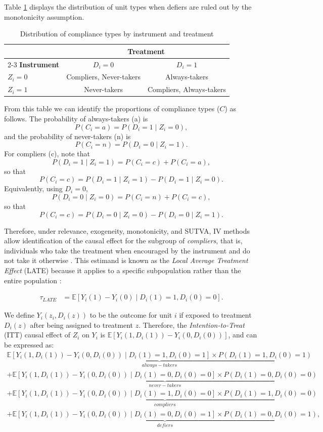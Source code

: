Table \ref{tab:2x2} displays the distribution of unit types when defiers are ruled out by the monotonicity assumption. 

\begin{table}[ht]
	\centering
	\caption{Distribution of compliance types by instrument and treatment}\label{tab:2x2}
	\begin{tabular}{lcc}
		\hline
		& \multicolumn{2}{c}{\textbf{Treatment}} \\ 
		\cline{2-3}
		\textbf{Instrument} & $D_i = 0$ & $D_i = 1$ \\ 
		\hline
		$Z_i=0$  & Compliers, Never-takers & Always-takers \\[0.25em]
		$Z_i=1$  & Never-takers & Compliers, Always-takers \\ 
		\hline
	\end{tabular}
\end{table}

From this table we can identify the proportions of compliance types ($C$) as follows. The probability of always-takers (a) is
\[
P(C_i = a) = P(D_i=1 \mid Z_i=0),
\]
and the probability of never-takers (n) is
\[
P(C_i = n) = P(D_i=0 \mid Z_i=1).
\]
For compliers (c), note that
\[
P(D_i=1 \mid Z_i=1) = P(C_i=c) + P(C_i=a),
\]
so that
\[
P(C_i = c) = P(D_i=1 \mid Z_i=1) - P(D_i=1 \mid Z_i=0).
\]
Equivalently, using $D_i=0$,
\[
P(D_i=0 \mid Z_i=0) = P(C_i=n) + P(C_i=c),
\]
so that
\[
P(C_i = c) = P(D_i=0 \mid Z_i=0) - P(D_i=0 \mid Z_i=1).
\]

Therefore, under relevance, exogeneity, monotonicity, and SUTVA, IV methods allow identification of the causal effect for the subgroup of \textit{compliers}, that is, individuals who take the treatment when encouraged by the instrument and do not take it otherwise \cite{imbens1994identification,angrist1996identification}. This estimand is known as the \textit{Local Average Treatment Effect} (LATE) because it applies to a specific subpopulation rather than the entire population \cite{hernan2020causal}:

\begin{align*}
	\tau_{LATE} 
	&= \mathbb{E}[Y_i(1)-Y_i(0)\mid D_i(1)=1, D_i(0)=0].
\end{align*}

We define $Y_i(z_i,D_i(z))$ to be the outcome for unit $i$ if exposed to treatment $D_i(z)$ after being assigned to treatment $z$. Therefore, the \textit{Intention-to-Treat} (ITT) causal effect of $Z_i$ on $Y_i$ is $\mathbb{E}[Y_i(1,D_i(1))-Y_i(0,D_i(0))]$, and can be expressed as:
\begin{align*}
	\underbrace{\mathbb{E}[Y_i(1,D_i(1))-Y_i(0,D_i(0))\mid D_i(1)=1,D_i(0)=1]\times P(D_i(1)=1,D_i(0)=1)}_{always-takers}\\
	+\underbrace{\mathbb{E}[Y_i(1,D_i(1))-Y_i(0,D_i(0))\mid D_i(1)=0,D_i(0)=0]\times P(D_i(1)=0,D_i(0)=0)}_{never-takers}\\
	+\underbrace{\mathbb{E}[Y_i(1,D_i(1))-Y_i(0,D_i(0))\mid D_i(1)=1,D_i(0)=0]\times P(D_i(1)=1,D_i(0)=0)}_{compliers}\\
	+\underbrace{\mathbb{E}[Y_i(1,D_i(1))-Y_i(0,D_i(0))\mid D_i(1)=0,D_i(0)=1]\times P(D_i(1)=0,D_i(0)=1)}_{defiers},\\
\end{align*}


